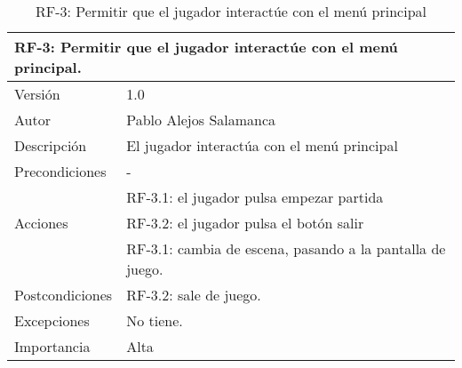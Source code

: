 \begin{table}[h!]
\centering
\begin{tabular}{|l|l|}
\hline
\multicolumn{2}{|l|}{\cellcolor[HTML]{C0C0C0}RF-3: Permitir que el jugador interactúe con el menú principal.} \\ \hline
Versión                                   & 1.0                                                               \\ \hline
Autor                                     & Pablo Alejos Salamanca                                            \\ \hline
Descripción                               & El jugador interactúa con el menú principal                       \\ \hline
Precondiciones                            & -                                                                 \\ \hline
                                          & RF-3.1: el jugador pulsa empezar partida                          \\ \cline{2-2} 
\multirow{-2}{*}{Acciones}                & RF-3.2: el jugador pulsa el botón salir                           \\ \hline
                                          & RF-3.1: cambia de escena, pasando a la pantalla de juego.         \\ \cline{2-2} 
\multirow{-2}{*}{Postcondiciones}         & RF-3.2: sale de juego.                                            \\ \hline
Excepciones                               & No tiene.                                                         \\ \hline
Importancia                               & Alta                                                              \\ \hline
\end{tabular}
\caption{RF-3: Permitir que el jugador interactúe con el menú principal}
\label{RF3}
\end{table}


